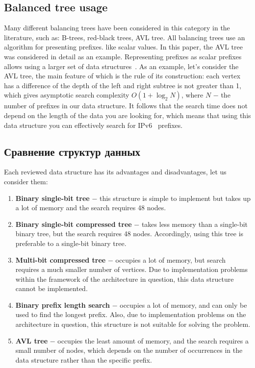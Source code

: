 \documentclass[conference]{IEEEtran}
\begin{document}
        \subsection{Balanced tree usage}
            \label{section:avlrev}
            Many different balancing trees have been considered in this category in the literature, such as: B-trees,
            red-black trees, AVL tree. All balancing trees use an algorithm for presenting prefixes.
            like scalar values.
            In this paper, the AVL tree was considered in detail as an example.
            Representing prefixes as scalar prefixes allows using a larger set of data structures~\cite{behdadfar2009scalar}. 
            As an example, let's consider the AVL tree, the main feature of which 
            is the rule of its construction: each vertex has a difference of 
            the depth of the left and right subtree is not greater than 1, which gives 
            asymptotic search complexity {\ttfamily $O(1+\log_2{N})$}, 
            where {\ttfamily $N$} $-$ the number of prefixes in our data structure. 
            It follows that the search time does not depend on the length of the data you are looking for,
            which means that using this data structure you can effectively search for IPv6~\cite{behdadfar2011coded} prefixes. 
            \\
    \subsection{Сравнение структур данных}
        Each reviewed data structure has its advantages and disadvantages, let us consider them:
        \begin{enumerate}
            \item \textbf{Binary single-bit tree} $-$ this structure is simple to implement but 
                takes up a lot of memory and the search requires 48 nodes.
            \item \textbf{Binary single-bit compressed tree} $-$ takes less memory than 
                a single-bit binary tree, but the search requires 48 nodes. 
                Accordingly, using this tree is preferable to a single-bit binary tree.
            \item \textbf{Multi-bit compressed tree} $-$ occupies a lot of memory, but search requires a much smaller number of vertices. 
                Due to implementation problems within the framework of the architecture in question, this data structure cannot be implemented.
            \item \textbf{Binary prefix length search} $-$ occupies a lot of memory, and can only be used to find the longest prefix.
                Also, due to implementation problems on the architecture in question, this structure is not suitable for solving the problem.
            \item \textbf{AVL tree} $-$ occupies the least amount of memory, and the search requires a small number of nodes,
                which depends on the number of occurrences in the data structure rather than the specific prefix.
        \end{enumerate}
\end{document}
